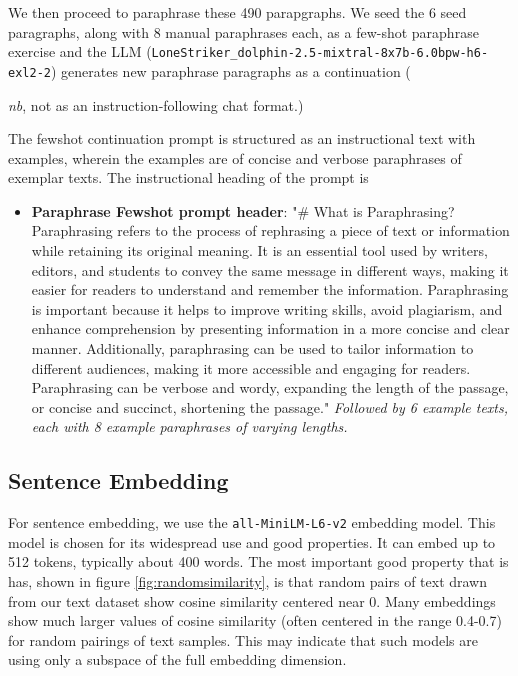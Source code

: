 \documentclass{article}
\begin{document}
We then proceed to paraphrase these 490 parapgraphs.  
We seed the 6 seed paragraphs, along with 8 manual paraphrases each, as a few-shot paraphrase exercise and the LLM  (\texttt{LoneStriker\_dolphin-2.5-mixtral-8x7b-6.0bpw-h6-exl2-2}) generates new paraphrase paragraphs as a continuation ({\textit{nb}, not as an instruction-following chat format.)

The fewshot continuation prompt is structured as an instructional text with examples, wherein the examples are of concise and verbose paraphrases of exemplar texts.  
The instructional heading of the prompt is

\begin{itemize}
	\item \textbf{Paraphrase Fewshot prompt header}: "\# What is Paraphrasing?
	Paraphrasing refers to the process of rephrasing a piece of text or information while retaining its original meaning. It is an essential tool 
	used by writers, editors, and students to convey the same message in different ways, making it easier for readers to understand and remember the information. Paraphrasing is important because it helps to improve writing skills, avoid plagiarism, and enhance comprehension by presenting information in a more concise and clear manner. Additionally, paraphrasing can be used to tailor information to different audiences, making 
	it more accessible and engaging for readers.  Paraphrasing can be verbose and wordy, expanding the length of the passage, or concise and succinct, shortening the passage." \textit{Followed by 6 example texts, each with 8 example paraphrases of varying lengths.}
\end{itemize}



\subsection{Sentence Embedding}

For sentence embedding, we use the \texttt{all-MiniLM-L6-v2} \citep{DBLP:journals/corr/abs-2002-10957} embedding model.
This model is chosen for its widespread use and good properties.  
It can embed up to 512 tokens, typically about 400 words.
The most important good property that is has, shown in figure \ref{fig:randomsimilarity}, is that random pairs of text drawn from our text dataset show cosine similarity centered near 0.  
Many embeddings show much larger values of cosine similarity (often centered in the range 0.4-0.7) for random pairings of text samples.
This may indicate \citep{badembeddings} that such models are using only a subspace of the full embedding dimension.

}
\end{document}
